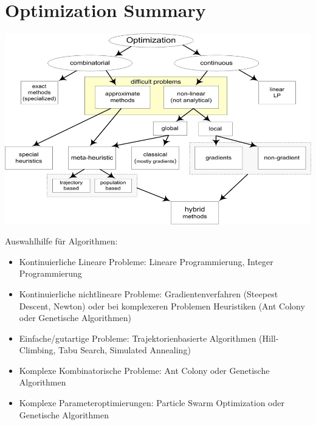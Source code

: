 \section{Optimization Summary}
  \includegraphics[width=\textwidth]{./Content/OptimizationSummary/Summary}
  
  Auswahlhilfe für Algorithmen:
  \begin{itemize}
    \item Kontinuierliche Lineare Probleme: Lineare Programmierung, Integer Programmierung
    \item Kontinuierliche nichtlineare Probleme: Gradientenverfahren (Steepest Descent, Newton) oder bei komplexeren Problemen Heuristiken (Ant Colony oder Genetische Algorithmen)
    \item Einfache/gutartige Probleme: Trajektorienbasierte Algorithmen (Hill-Climbing, Tabu Search, Simulated Annealing)
    \item Komplexe Kombinatorische Probleme: Ant Colony oder Genetische Algorithmen
    \item Komplexe Parameteroptimierungen: Particle Swarm Optimization oder Genetische Algorithmen
  \end{itemize}